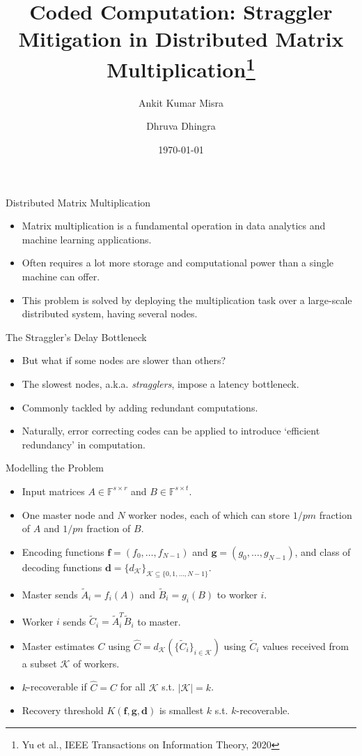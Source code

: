 \documentclass{beamer}
\title{Coded Computation: Straggler Mitigation in Distributed Matrix Multiplication\thanks{Yu et al., IEEE Transactions on Information Theory, 2020}}
\author{Ankit Kumar Misra \and Dhruva Dhingra}
\institute{EE 605: Error Correcting Codes, \\Autumn 2022, IIT Bombay}
\date{\today}
\begin{document}
\frame{\titlepage}

\begin{frame}{Distributed Matrix Multiplication}
\begin{itemize}
    \item Matrix multiplication is a fundamental operation in data analytics and machine learning applications.
    \item Often requires a lot more storage and computational power than a single machine can offer.
    \item This problem is solved by deploying the multiplication task over a large-scale distributed system, having several nodes.
\end{itemize}
\end{frame}

\begin{frame}{The Straggler's Delay Bottleneck}
\begin{itemize}
    \item But what if some nodes are slower than others?
    \item The slowest nodes, a.k.a. \textit{stragglers}, impose a latency bottleneck.
    \item Commonly tackled by adding redundant computations.
    \item Naturally, error correcting codes can be applied to introduce `efficient redundancy' in computation.
\end{itemize}
\end{frame}

\begin{frame}{Modelling the Problem}
\begin{itemize}
    \item Input matrices $A\in \mathbb{F}^{s\times r}$ and $B\in\mathbb{F}^{s\times t}$.
    \item One master node and $N$ worker nodes, each of which can store $1/pm$ fraction of $A$ and $1/pn$ fraction of $B$.
    \item Encoding functions $\mathbf{f} = (f_0,\dots,f_{N-1})$ and $\mathbf{g} = (g_0,\dots,g_{N-1})$, and class of decoding functions $\mathbf{d} = \{d_{\mathcal{K}}\}_{\mathcal{K}\subseteq \{0,1,\dots,N-1\}}$.
    \item Master sends $\tilde{A}_i = f_i(A)$ and $\tilde{B}_i = g_i(B)$ to worker $i$.
    \item Worker $i$ sends $\tilde{C}_i = \tilde{A}^T_i\tilde{B}_i$ to master.
    \item Master estimates $C$ using $\hat{C} = d_{\mathcal{K}}(\{\tilde{C}_i\}_{i\in\mathcal{K}})$ using $\tilde{C}_i$ values received from a subset $\mathcal{K}$ of workers.
    \item $k$-recoverable if $\hat{C}=C$ for all $\mathcal{K}$ s.t. $|\mathcal{K}|=k$.
    \item Recovery threshold $K(\mathbf{f}, \mathbf{g}, \mathbf{d})$ is smallest $k$ s.t. $k$-recoverable.
\end{itemize}
\end{frame}
\end{document}
